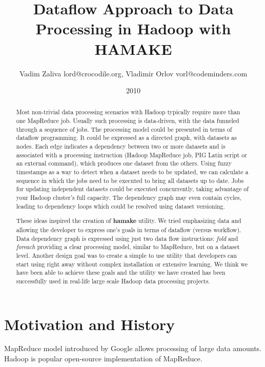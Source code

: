 \documentclass{article}
\author{Vadim Zaliva lord@crocodile.org, Vladimir Orlov vorl@codeminders.com}
\date{2010}
\title{Dataflow Approach to Data Processing in Hadoop with HAMAKE}
\begin{document}
\lstset{language=XML,basicstyle=\tiny,markfirstintag=true,numbers=left, numberstyle=\tiny}

\maketitle

\begin{abstract}
  Most non-trivial data processing scenarios with Hadoop typically
  require more than one MapReduce job. Usually such processing is
  data-driven, with the data funneled through a sequence of jobs. The
  processing model could be presented in terms of dataflow
  programming. It could be expressed as a directed graph, with
  datasets as nodes. Each edge indicates a dependency between two or
  more datasets and is associated with a processing instruction
  (Hadoop MapReduce job, PIG Latin script or an external command),
  which produces one dataset from the others. Using fuzzy timestamps
  as a way to detect when a dataset needs to be updated, we can
  calculate a sequence in which the jobs need to be executed to bring
  all datasets up to date. Jobs for updating independent datasets
  could be executed concurrently, taking advantage of your Hadoop
  cluster's full capacity. The dependency graph may even contain
  cycles, leading to dependency loops which could be resolved using
  dataset versioning.

  These ideas inspired the creation of \textbf{hamake} utility. We
  tried emphasizing data and allowing the developer to express one's
  goals in terms of dataflow (versus workflow). Data dependency graph
  is expressed using just two data flow instructions: \emph{fold} and
  \emph{foreach} providing a clear processing model, similar to
  MapReduce, but on a dataset level. Another design goal was to create
  a simple to use utility that developers can start using right away
  without complex installation or extensive learning. We think we have
  been able to achieve these goals and the utility we have created has
  been successfully used in real-life large scale Hadoop data
  processing projects.
\end{abstract}

\section{Motivation and History}

MapReduce model introduced by Google\cite{dean2008map} allows
processing of large data amounts. Hadoop\cite{bialecki2005hadoop} is
popular open-source implementation of MapReduce.
\end{document}
